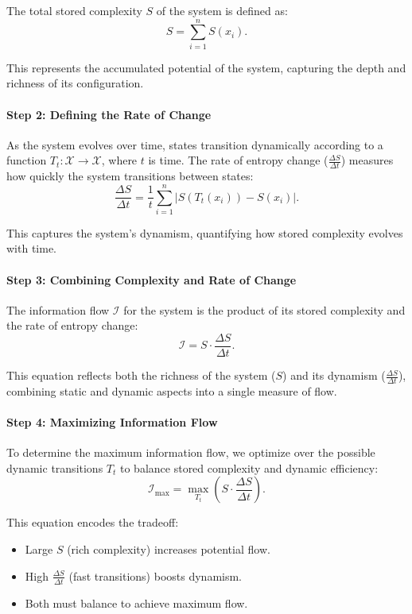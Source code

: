 \documentclass[12pt]{article}
\begin{document}
The total stored complexity \(S\) of the system is defined as:
\[
S = \sum_{i=1}^n S(x_i).
\]

This represents the accumulated potential of the system, capturing the depth and richness of its configuration.

\paragraph{Step 2: Defining the Rate of Change}
As the system evolves over time, states transition dynamically according to a function \(T_t: \mathcal{X} \to \mathcal{X}\), where \(t\) is time. The rate of entropy change (\(\frac{\Delta S}{\Delta t}\)) measures how quickly the system transitions between states:
\[
\frac{\Delta S}{\Delta t} = \frac{1}{t} \sum_{i=1}^n |S(T_t(x_i)) - S(x_i)|.
\]

This captures the system’s dynamism, quantifying how stored complexity evolves with time.

\paragraph{Step 3: Combining Complexity and Rate of Change}
The information flow \(\mathcal{I}\) for the system is the product of its stored complexity and the rate of entropy change:
\[
\mathcal{I} = S \cdot \frac{\Delta S}{\Delta t}.
\]

This equation reflects both the richness of the system (\(S\)) and its dynamism (\(\frac{\Delta S}{\Delta t}\)), combining static and dynamic aspects into a single measure of flow.

\paragraph{Step 4: Maximizing Information Flow}
To determine the maximum information flow, we optimize over the possible dynamic transitions \(T_t\) to balance stored complexity and dynamic efficiency:
\[
\mathcal{I}_{\text{max}} = \max_{T_t} \left(S \cdot \frac{\Delta S}{\Delta t}\right).
\]

This equation encodes the tradeoff:
\begin{itemize}
    \item Large \(S\) (rich complexity) increases potential flow.
    \item High \(\frac{\Delta S}{\Delta t}\) (fast transitions) boosts dynamism.
    \item Both must balance to achieve maximum flow.
\end{itemize}
\end{document}
